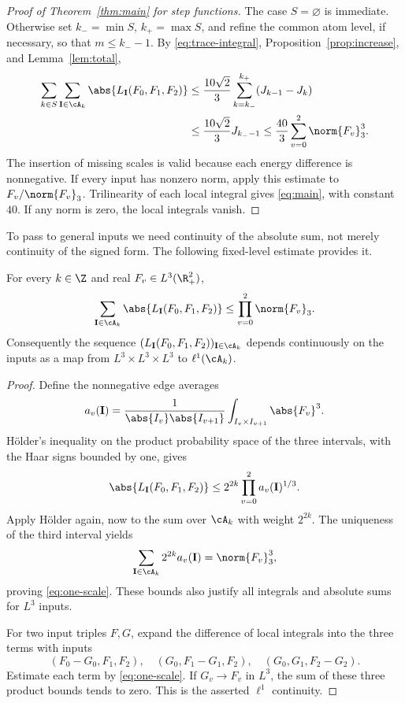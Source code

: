 \begin{proof}[Proof of Theorem~\ref{thm:main} for step functions]
The case \(S=\varnothing\) is immediate. Otherwise set
\(k_-=\min S\), \(k_+=\max S\), and refine the common atom level,
if necessary, so that \(m\le k_--1\). By \eqref{eq:trace-integral},
Proposition~\ref{prop:increase}, and Lemma~\ref{lem:total},
\begin{align*}
 \sum_{k\in S}\sum_{\mathbf I\in\cA_k}\abs{L_{\mathbf I}(F_0,F_1,F_2)}
 &\le\frac{10\sqrt2}{3}
       \sum_{k=k_-}^{k_+}(J_{k-1}-J_k)\\
 &\le\frac{10\sqrt2}{3}J_{k_--1}
 \le\frac{40}{3}\sum_{v=0}^2\norm{F_v}_3^3.
\end{align*}
The insertion of missing scales is valid because each energy
difference is nonnegative. If every input has nonzero norm, apply
this estimate to \(F_v/\norm{F_v}_3\). Trilinearity of each local
integral gives \eqref{eq:main}, with constant \(40\).
If any norm is zero, the local integrals vanish.
\end{proof}

To pass to general inputs we need continuity of the absolute sum,
not merely continuity of the signed form. The following fixed-level
estimate provides it.

\begin{lemma}\label{lem:continuity}
For every \(k\in\Z\) and real \(F_v\in L^3(\R_+^2)\),
\begin{equation}\label{eq:one-scale}
 \sum_{\mathbf I\in\cA_k}\abs{L_{\mathbf I}(F_0,F_1,F_2)}
       \le\prod_{v=0}^2\norm{F_v}_3.
\end{equation}
Consequently the sequence
\((L_{\mathbf I}(F_0,F_1,F_2))_{\mathbf I\in\cA_k}\) depends
continuously on the inputs as a map from \(L^3\times L^3\times L^3\)
to \(\ell^1(\cA_k)\).
\end{lemma}

\begin{proof}
Define the nonnegative edge averages
\[
 a_v(\mathbf I)=
 \frac1{\abs{I_v}\abs{I_{v+1}}}
            \int_{I_v\times I_{v+1}}\abs{F_v}^3.
\]
H\"older's inequality on the product probability space of the three
intervals, with the Haar signs bounded by one, gives
\[
 \abs{L_{\mathbf I}(F_0,F_1,F_2)}
       \le2^{2k}\prod_{v=0}^2 a_v(\mathbf I)^{1/3}.
\]
Apply H\"older again, now to the sum over \(\cA_k\) with weight
\(2^{2k}\). The uniqueness of the third interval yields
\[
 \sum_{\mathbf I\in\cA_k}2^{2k}a_v(\mathbf I)=\norm{F_v}_3^3,
\]
proving \eqref{eq:one-scale}. These bounds also justify all integrals
and absolute sums for \(L^3\) inputs.

For two input triples \(F,G\), expand the difference of local
integrals into the three terms with inputs
\[
 (F_0-G_0,F_1,F_2),\quad
 (G_0,F_1-G_1,F_2),\quad
 (G_0,G_1,F_2-G_2).
\]
Estimate each term by \eqref{eq:one-scale}. If \(G_v\to F_v\) in
\(L^3\), the sum of these three product bounds tends to zero.
This is the asserted \(\ell^1\) continuity.
\end{proof}

